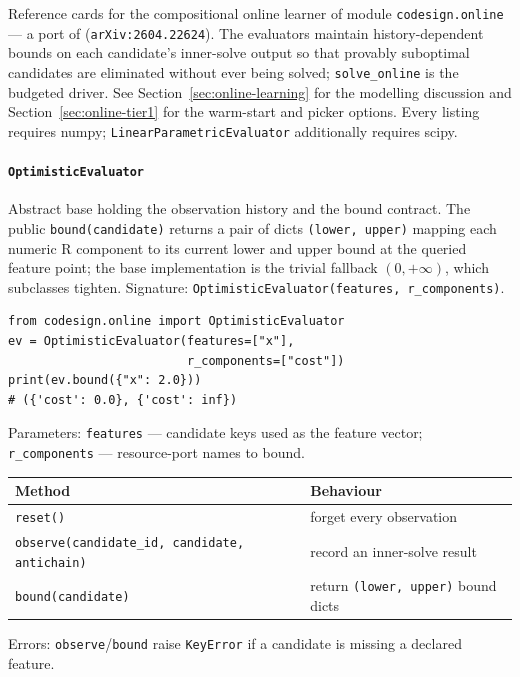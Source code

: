 \documentclass[11pt,a4paper]{article}
\begin{document}
Reference cards for the compositional online learner of module
\texttt{codesign.online} --- a port of \citet{alharbi2026online}
(\texttt{arXiv:2604.22624}). The evaluators maintain history-dependent
bounds on each candidate's inner-solve output so that provably suboptimal
candidates are eliminated without ever being solved;
\texttt{solve\_online} is the budgeted driver. See
Section~\ref{sec:online-learning} for the modelling discussion and
Section~\ref{sec:online-tier1} for the warm-start and picker options. Every
listing requires numpy; \texttt{LinearParametricEvaluator} additionally
requires scipy.

\paragraph{\texttt{OptimisticEvaluator}}\label{ref:online:optimisticevaluator}
Abstract base holding the observation history and the bound contract. The
public \texttt{bound(candidate)} returns a pair of dicts
\texttt{(lower, upper)} mapping each numeric R component to its current
lower and upper bound at the queried feature point; the base implementation
is the trivial fallback $(0, +\infty)$, which subclasses tighten.
Signature: \texttt{OptimisticEvaluator(features, r\_components)}.
\begin{lstlisting}
from codesign.online import OptimisticEvaluator
ev = OptimisticEvaluator(features=["x"],
                         r_components=["cost"])
print(ev.bound({"x": 2.0}))
# ({'cost': 0.0}, {'cost': inf})
\end{lstlisting}
Parameters: \texttt{features} --- candidate keys used as the feature vector;
\texttt{r\_components} --- resource-port names to bound.
\begin{center}
\begin{tabular}{@{}ll@{}}
\toprule
Method & Behaviour \\
\midrule
\texttt{reset()} & forget every observation \\
\texttt{observe(candidate\_id, candidate, antichain)} & record an
  inner-solve result \\
\texttt{bound(candidate)} & return \texttt{(lower, upper)} bound dicts \\
\bottomrule
\end{tabular}
\end{center}
Errors: \texttt{observe}/\texttt{bound} raise \texttt{KeyError} if a
candidate is missing a declared feature.
\end{document}
